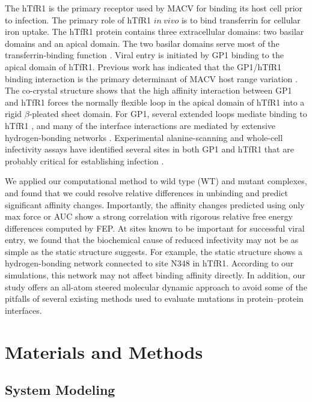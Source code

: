 \documentclass[12pt]{article}
\begin{document}
The hTfR1 is the primary receptor used by MACV for binding its host cell prior to infection. The primary role of hTfR1 $in~vivo$ is to bind transferrin for cellular iron uptake. The hTfR1 protein contains three extracellular domains: two basilar domains and an apical domain. The two basilar domains serve most of the transferrin-binding function \citep{Abraham2010,Rad20112}. Viral entry is initiated by GP1 binding to the apical domain of hTfR1. Previous work has indicated that the GP1/hTfR1 binding interaction is the primary determinant of MACV host range variation \citep{Rad20111,Rad20112}. The co-crystal structure shows that the high affinity interaction between GP1 and hTfR1 forces the normally flexible loop in the apical domain of hTfR1 into a rigid $\beta$-pleated sheet domain. For GP1, several extended loops mediate binding to hTfR1 \citep{Abraham2010,Rad20112}, and many of the interface interactions are mediated by extensive hydrogen-bonding networks \citep{Abraham2010}. Experimental alanine-scanning and whole-cell infectivity assays have identified several sites in both GP1 and hTfR1 that are probably critical for establishing infection \citep{Rad20111,Rad20112}.

We applied our computational method to wild type (WT) and mutant complexes, and found that we could resolve relative differences in unbinding and predict significant affinity changes. Importantly, the affinity changes predicted using only max force or AUC show a strong correlation with rigorous relative free energy differences computed by FEP. At sites known to be important for successful viral entry, we found that the biochemical cause of reduced infectivity may not be as simple as the static structure suggests. For example, the static structure shows a hydrogen-bonding network connected to site N348 in hTfR1. According to our simulations, this network may not affect binding affinity directly. In addition, our study offers an all-atom steered molecular dynamic approach to avoid some of the pitfalls of several existing methods used to evaluate mutations in protein--protein interfaces.

\section{Materials and Methods}

\subsection{System Modeling}
\end{document}
